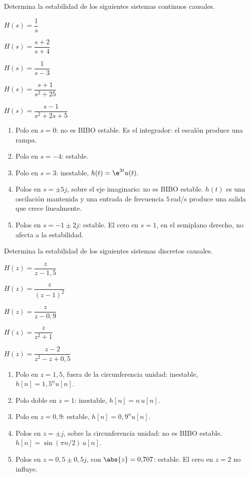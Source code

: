 \documentclass[11pt,a4paper]{scrartcl}
\begin{document}
\begin{ejercicio}
  Determina la estabilidad de los siguientes sistemas continuos causales.
  \begin{incisos}[3]
    \item $H(s)=\dfrac1s$
    \item $H(s)=\dfrac{s+2}{s+4}$
    \item $H(s)=\dfrac{1}{s-3}$
    \item $H(s)=\dfrac{s+1}{s^2+25}$
    \item $H(s)=\dfrac{s-1}{s^2+2s+5}$
  \end{incisos}
\end{ejercicio}
\begin{solucion}
  \begin{enumerate}[label=\alph*)]
    \item Polo en $s=0$: no es BIBO estable. Es el integrador: el escalón produce una rampa.
    \item Polo en $s=-4$: estable.
    \item Polo en $s=3$: inestable, $h(t)=\e^{3t}u(t)$.
    \item Polos en $s=\pm5j$, sobre el eje imaginario: no es BIBO estable. $h(t)$ es una oscilación mantenida y una entrada de frecuencia $5$\,rad/s produce una salida que crece linealmente.
    \item Polos en $s=-1\pm2j$: estable. El cero en $s=1$, en el semiplano derecho, no afecta a la estabilidad.
  \end{enumerate}
\end{solucion}

\begin{ejercicio}
  Determina la estabilidad de los siguientes sistemas discretos causales.
  \begin{incisos}[3]
    \item $H(z)=\dfrac{z}{z-1{,}5}$
    \item $H(z)=\dfrac{z}{(z-1)^2}$
    \item $H(z)=\dfrac{z}{z-0{,}9}$
    \item $H(z)=\dfrac{z}{z^2+1}$
    \item $H(z)=\dfrac{z-2}{z^2-z+0{,}5}$
  \end{incisos}
\end{ejercicio}
\begin{solucion}
  \begin{enumerate}[label=\alph*)]
    \item Polo en $z=1{,}5$, fuera de la circunferencia unidad: inestable, $h[n]=1{,}5^nu[n]$.
    \item Polo doble en $z=1$: inestable, $h[n]=n\,u[n]$.
    \item Polo en $z=0{,}9$: estable, $h[n]=0{,}9^nu[n]$.
    \item Polos en $z=\pm j$, sobre la circunferencia unidad: no es BIBO estable. $h[n]=\sin(\pi n/2)\,u[n]$.
    \item Polos en $z=0{,}5\pm0{,}5j$, con $\abs{z}=0{,}707$: estable. El cero en $z=2$ no influye.
  \end{enumerate}
\end{solucion}
\end{document}
